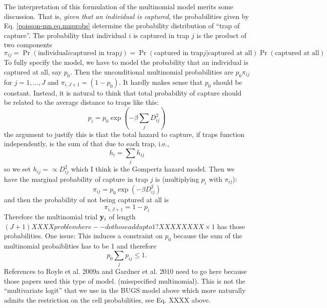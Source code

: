 
The interpretation of this formulation of the multinomial model merits
some discussion. That is, {\it given that an individual is captured},
the probabilities given by Eq. \ref{poisson-mn.eq.mnprobs} determine
the probability distribution of ``trap of capture''.  The probability
that individual $i$ is captured in trap $j$ is the product of two
components
\[
\pi_{ij} = \Pr(\mbox{individual} i \mbox{captured in trap} j) = 
 \Pr(\mbox{captured in trap} j | \mbox{captured at all})\Pr(\mbox{captured at all})
\]
To fully specify the model, we have to model the probability that an
individual is captured at all, say $p_0$. Then the unconditional
multinomial probabilities are $p_{0} \pi_{ij}$ for $j=1,\ldots,J$ and
$\pi_{i,J+1} = (1-p_{0})$.  It hardly makes sense that $p_{0}$ should
be constant.  Instead, it is natural to think that total probability
of capture should be related to the average distance to traps like
this:
\[
 p_{i} = p_{0} \exp(-\beta \sum_{j} D_{ij}^2)
\]
the argument to justify this is that the total hazard to capture, if
traps function independently, is the sum of that due to each trap, i.e.,
\[
 h_{i} = \sum_{j} h_{ij}
\]
so we set $h_{ij} = \propto D_{ij}^{2}$ which I think is the Gompertz
hazard model.  
Then we have the marginal probability of capture in trap $j$ is
(multiplying $p_{i}$ with $\pi_{ij}$):
\[
\pi_{ij} =   p_{0}  \exp(-\beta D_{ij}^2)
\]
and then the probability of not being captured at all is 
\[
 \pi_{i,J+1} =  1-p_i 
\]
Therefore the multinomial trial ${\bf y}_{i}$ of length  $(J+1)
XXXX problem here -- do those add up to 1? XXXXX
XXX
\times 1$ has those probabilities.  One issue: This induces a
constraint on $p_{0}$ because the sum of the multinomial probaiblities
has to be 1 and therefore 
\[
p_{0} \sum_{j} p_{ij} \le 1.
\]
References to Royle et al. 2009a and Gardner et al. 2010 need to go
here because those papers used this type of model. (misspecified
multinomial). 
This is not the ``multivariate logit'' that
we use in the BUGS model above which more naturally admits the
restriction on the cell probabilities, see Eq. XXXX above.  

